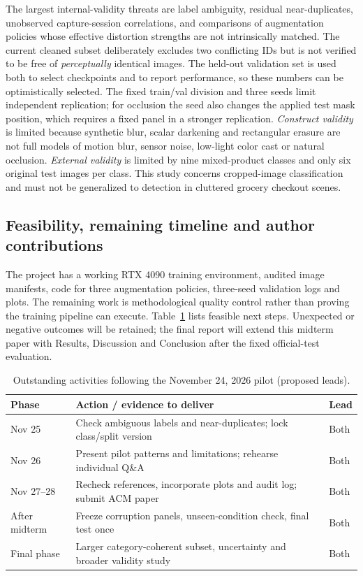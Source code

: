 \documentclass[sigconf,nonacm]{acmart}
\begin{document}
The largest internal-validity threats are label ambiguity, residual near-duplicates, unobserved capture-session correlations, and comparisons of augmentation policies whose effective distortion strengths are not intrinsically matched. The current cleaned subset deliberately excludes two conflicting IDs but is not verified to be free of \emph{perceptually} identical images. The held-out validation set is used both to select checkpoints and to report performance, so these numbers can be optimistically selected. The fixed train/val division and three seeds limit independent replication; for occlusion the seed also changes the applied test mask position, which requires a fixed panel in a stronger replication. \emph{Construct validity} is limited because synthetic blur, scalar darkening and rectangular erasure are not full models of motion blur, sensor noise, low-light color cast or natural occlusion. \emph{External validity} is limited by nine mixed-product classes and only six original test images per class. This study concerns cropped-image classification and must not be generalized to detection in cluttered grocery checkout scenes.

\subsection{Feasibility, remaining timeline and author contributions}
The project has a working RTX 4090 training environment, audited image manifests, code for three augmentation policies, three-seed validation logs and plots. The remaining work is methodological quality control rather than proving the training pipeline can execute. Table~\ref{tab:plan} lists feasible next steps. Unexpected or negative outcomes will be retained; the final report will extend this midterm paper with Results, Discussion and Conclusion after the fixed official-test evaluation.

\begin{table}[t]
\caption{Outstanding activities following the November 24, 2026 pilot (proposed leads).}
\label{tab:plan}
\small
\begin{tabular}{p{}p{}p{}}
\toprule
Phase & Action / evidence to deliver & Lead\\
\midrule
Nov 25 & Check ambiguous labels and near-duplicates; lock class/split version & Both\\
Nov 26 & Present pilot patterns and limitations; rehearse individual Q\&A & Both\\
Nov 27--28 & Recheck references, incorporate plots and audit log; submit ACM paper & Both\\
After midterm & Freeze corruption panels, unseen-condition check, final test once & Both\\
Final phase & Larger category-coherent subset, uncertainty and broader validity study & Both\\
\bottomrule
\end{tabular}
\end{table}
\end{document}
